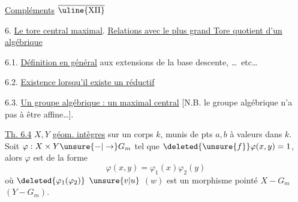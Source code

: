 \uline{Compléments} $\overline{\text{\uline{XII}}}$

6. \uline{Le tore central maximal}. \uline{Relations avec le plus grand Tore quotient d'un  algébrique}

6.1. \uline{Définition en général}  aux extensions de la base descente, \ldots\ etc\ldots

6.2. \uline{Existence lorsqu'il existe un  réductif}

6.3.  \uline{Un groupe algébrique : un  maximal central} [N.B. le groupe algébrique n'a pas à être affine\ldots].


\uline{Th. 6.4} $X,Y$ \uline{géom. intègres} sur un corps $k$, munis de pts $a,b$ à valeurs dans $k$. Soit $\varphi:X\times Y\unsure{\mathord{-}|\to}G_m$ tel que $\deleted{\unsure{f}}\varphi(x,y)=1$, alors $\varphi$ est de la forme
\[
\varphi(x,y)=\varphi_1(x)\varphi_2(y)
\]
où $\deleted{\varphi_1(\varphi_2)}$ $\unsure{v|u}$ $(w)$ est un morphisme pointé $X\mathrel{-}G_m$ $(Y\mathrel{-}G_m)$.
